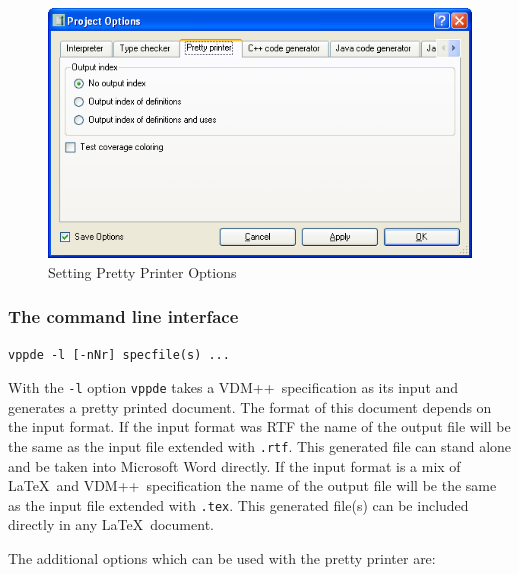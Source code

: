 \documentclass[\pformat,12pt]{article}
\newcommand{\vdmslpp}{VDM++}
\newcommand{\vdmde}{vppde}
\begin{document}
\begin{figure}[tbh]
\begin{center}
\includegraphics[width=12cm]{ppOptions-ppENG.png}
\caption{Setting Pretty Printer Options}
\label{fig:optpp}
\end{center}
\end{figure}

\subsubsection{The command line interface} \label{vdm2tex}

{\tt \vdmde\ -l [-nNr] specfile(s) ...}

\vspace{0.5cm}

\noindent
With the {\tt -l} option {\tt \vdmde} takes a \vdmslpp\
specification as its input and generates a pretty printed
document. The format of this document depends on the
input format. If the input format was RTF the name of the output file
will be the same as the input file extended with {\tt .rtf}. This
generated file can stand alone and be taken into Microsoft Word
directly. If the input format is a mix of \LaTeX\ and \vdmslpp\ 
specification the name of the output file will be the same as the
input file extended with {\tt .tex}. This generated file(s) can be
included directly in any \LaTeX\ document.

The additional options which can be used with the pretty printer are:
\end{document}
